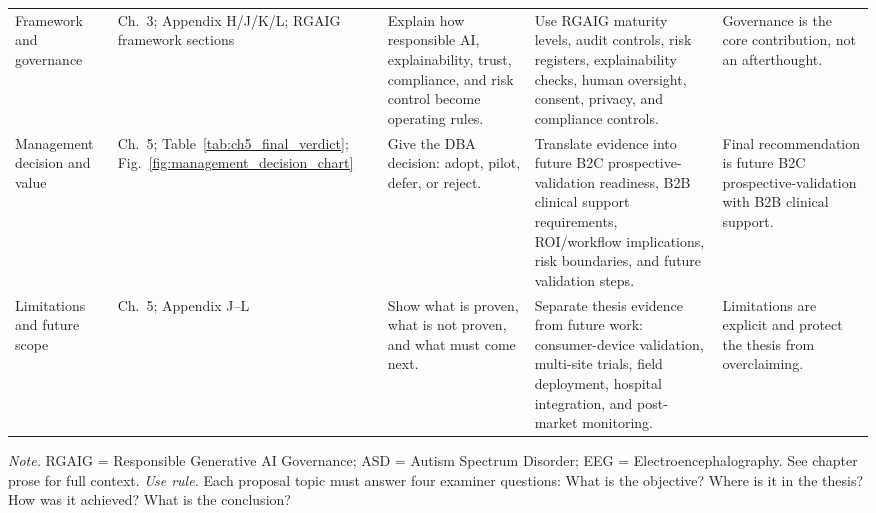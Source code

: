 {\begin{xltabular}{\textwidth}{@{} >{\raggedright\arraybackslash}p{2.0cm} p{2.0cm} p{2.8cm} p{4.3cm} >{\raggedright\arraybackslash}p{3.1cm} @{}}
\addlinespace
Framework and governance & Ch.~3; Appendix H/J/K/L; RGAIG framework sections & Explain how responsible AI, explainability, trust, compliance, and risk control become operating rules. & Use RGAIG maturity levels, audit controls, risk registers, explainability checks, human oversight, consent, privacy, and compliance controls. & Governance is the core contribution, not an afterthought. \\
\addlinespace
Management decision and value & Ch.~5; Table~\ref{tab:ch5_final_verdict}; Fig.~\ref{fig:management_decision_chart} & Give the DBA decision: adopt, pilot, defer, or reject. & Translate evidence into future B2C prospective-validation readiness, B2B clinical support requirements, ROI/workflow implications, risk boundaries, and future validation steps. & Final recommendation is future B2C prospective-validation with B2B clinical support. \\
\addlinespace
Limitations and future scope & Ch.~5; Appendix J--L & Show what is proven, what is not proven, and what must come next. & Separate thesis evidence from future work: consumer-device validation, multi-site trials, field deployment, hospital integration, and post-market monitoring. & Limitations are explicit and protect the thesis from overclaiming. \\
\end{xltabular}}
\vspace{0.3em}\noindent\textit{Note.} RGAIG = Responsible Generative AI Governance; ASD = Autism Spectrum Disorder; EEG = Electroencephalography. See chapter prose for full context.
\vspace{0.5em}
\noindent\textit{Use rule.} Each proposal topic must answer four examiner questions: What is the objective? Where is it in the thesis? How was it achieved? What is the conclusion?

